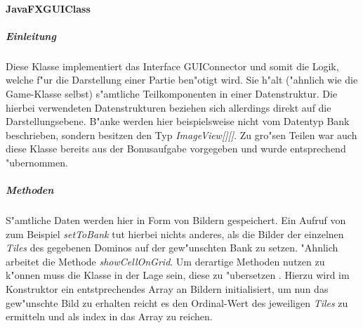 \paragraph{JavaFXGUIClass}
\label{par:javaFXGUI}

\subparagraph{Einleitung}
Diese Klasse implementiert das Interface GUIConnector und somit die Logik, welche f"ur die Darstellung einer Partie ben"otigt wird. Sie h"alt ("ahnlich wie die Game-Klasse selbst) s"amtliche Teilkomponenten in einer Datenstruktur. Die hierbei verwendeten Datenstrukturen beziehen sich allerdings direkt auf die Darstellungsebene. B"anke werden hier beispielsweise nicht vom Datentyp Bank beschrieben, sondern besitzen den Typ \emph{ImageView[][]}. Zu gro"sen Teilen war auch diese Klasse bereits aus der Bonusaufgabe vorgegeben und wurde entsprechend "ubernommen. 

\subparagraph{Methoden}
S"amtliche Daten werden hier in Form von Bildern gespeichert. Ein Aufruf von zum Beispiel \emph{setToBank} tut hierbei nichts anderes, als die Bilder der einzelnen \emph{Tiles} des gegebenen Dominos auf der gew"unschten Bank zu setzen. "Ahnlich arbeitet die Methode \emph{showCellOnGrid}. Um derartige Methoden nutzen zu k"onnen muss die Klasse in der Lage sein, diese zu \glqq "ubersetzen \grqq . Hierzu wird im Konstruktor ein entstprechendes Array an Bildern initialisiert, um nun das gew"unschte Bild zu erhalten reicht es den Ordinal-Wert des jeweiligen \emph{Tiles} zu ermitteln und als index in das Array zu reichen. 